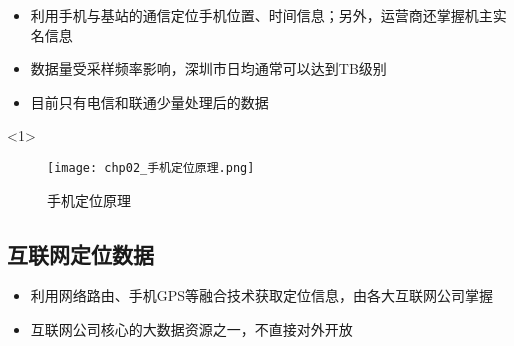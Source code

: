 \begin{frame}[t]{\subsecname}
\begin{itemize}
\item<1-> 利用手机与基站的通信定位手机位置、时间信息；另外，运营商还掌握机主实名信息
\item<2-> 数据量受采样频率影响，深圳市日均通常可以达到TB级别
\item<2-> 目前只有电信和联通少量处理后的数据
\end{itemize}

\begin{overlayarea}{\textwidth}{\textheight}
\vspace{-5pt}
  \begin{onlyenv}<1>
\begin{figure}
  \centering
  \texttt{[image: chp02\_手机定位原理.png]}
  \caption{手机定位原理}
\end{figure}
  \end{onlyenv}
\end{overlayarea}
\end{frame}

\subsection{互联网定位数据}

\begin{frame}[t]{\subsecname}
\begin{itemize}
\item 利用网络路由、手机GPS等融合技术获取定位信息，由各大互联网公司掌握
\item 互联网公司核心的大数据资源之一，不直接对外开放
\end{itemize}

\begin{figure}\centering
    \captionsetup[subfigure]{labelformat=empty}
    \vspace{1pt} 
\end{figure}
\end{frame}

